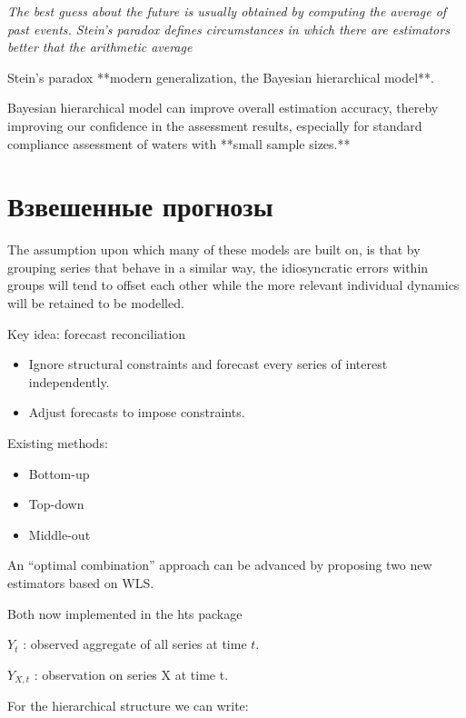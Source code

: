 \documentclass[12pt,a4paper, oneside]{extreport}
\begin{document}
\textit{The best guess about the future is usually  obtained by computing the average of past events. Stein's paradox defines circumstances in which there are estimators better that the arithmetic average
}

Stein’s paradox  **modern generalization, the Bayesian hierarchical model**. 

Bayesian hierarchical model can improve overall estimation accuracy, thereby improving our confidence in the assessment results, especially for standard compliance assessment of waters with **small sample sizes.**


\section{Взвешенные прогнозы}




The assumption upon which many of these models are built on, is that by grouping series that behave in a similar way, the idiosyncratic errors within groups will tend to offset each other while the more relevant individual dynamics will be retained to be modelled.



Key idea: forecast reconciliation
\begin{itemize}
	\item Ignore structural constraints and forecast
	every series of interest independently.
	\item Adjust forecasts to impose constraints.
\end{itemize}

Existing methods:
\begin{itemize}
	\item  Bottom-up
	\item  Top-down
	\item  Middle-out
	
\end{itemize}

An “optimal combination” 
approach can be advanced by proposing two new estimators
based on WLS.

Both now implemented in the hts package

$ Y_t $ : observed aggregate of all
series at time $ t $.

$ Y_{ X , t} $ : observation on series X at
time t.




For the hierarchical structure we can write: 
\end{document}
